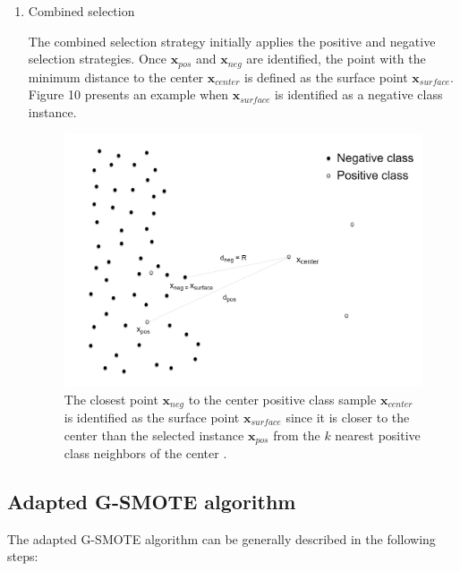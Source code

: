 \documentclass[parskip=full]{scrartcl}
\begin{document}
\begin{enumerate}[label=($\alph*$)]
\item Combined selection

The combined selection strategy initially applies the positive and negative 
selection strategies. Once \( \textbf{x}_{pos} \) and \( \textbf{x}_{neg} \) 
are identified, the point with the minimum distance to the center \( 
\textbf{x}_{center} \) is defined as the surface point \( \textbf{x}_{surface} 
\). Figure 10 presents an example when \( \textbf{x}_{surface} \) is identified 
as a negative class instance.

\begin{figure}[H]
	\centering
	\includegraphics[width=0.52\linewidth]
		{../analysis/combined_class_selection_strategy}
	\caption{The closest point \( \textbf{x}_{neg} \) to the center positive 
	class sample \( \textbf{x}_{center} \) is identified as the surface point 
	\( \textbf{x}_{surface} \) since it is closer to the center than the 
	selected instance \( \textbf{x}_{pos} \) from the \( k \) nearest 
	positive class neighbors of the center \cite{Douzas.2019}.}
	\label{fig:combinedclassselectionstrategy}
\end{figure}

\end{enumerate}

\subsection{Adapted G-SMOTE algorithm}

The adapted G-SMOTE algorithm can be generally described in the following steps:
\end{document}
